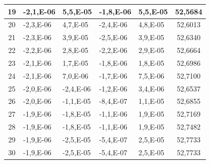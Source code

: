 \begin{table}[]
\begin{tabular}{|c|l|l|l|l|c|}
{\color[HTML]{000000} 19}      & {\color[HTML]{000000} -2,1,E-06}   & {\color[HTML]{000000} 5,5,E-05}    & {\color[HTML]{000000} -1,8,E-06}   & {\color[HTML]{000000} 5,5,E-05}       & {\color[HTML]{000000} 52,5684} \\ \hline
{\color[HTML]{000000} 20}      & {\color[HTML]{000000} -2,3,E-06}   & {\color[HTML]{000000} 4,7,E-05}    & {\color[HTML]{000000} -2,4,E-06}   & {\color[HTML]{000000} 4,8,E-05}       & {\color[HTML]{000000} 52,6013} \\ \hline
{\color[HTML]{000000} 21}      & {\color[HTML]{000000} -2,3,E-06}   & {\color[HTML]{000000} 3,9,E-05}    & {\color[HTML]{000000} -2,5,E-06}   & {\color[HTML]{000000} 3,9,E-05}       & {\color[HTML]{000000} 52,6340} \\ \hline
{\color[HTML]{000000} 22}      & {\color[HTML]{000000} -2,2,E-06}   & {\color[HTML]{000000} 2,8,E-05}    & {\color[HTML]{000000} -2,2,E-06}   & {\color[HTML]{000000} 2,9,E-05}       & {\color[HTML]{000000} 52,6664} \\ \hline
{\color[HTML]{000000} 23}      & {\color[HTML]{000000} -2,1,E-06}   & {\color[HTML]{000000} 1,7,E-05}    & {\color[HTML]{000000} -1,8,E-06}   & {\color[HTML]{000000} 1,8,E-05}       & {\color[HTML]{000000} 52,6986} \\ \hline
{\color[HTML]{000000} 24}      & {\color[HTML]{000000} -2,1,E-06}   & {\color[HTML]{000000} 7,0,E-06}    & {\color[HTML]{000000} -1,7,E-06}   & {\color[HTML]{000000} 7,5,E-06}       & {\color[HTML]{000000} 52,7100} \\ \hline
{\color[HTML]{000000} 25}      & {\color[HTML]{000000} -2,0,E-06}   & {\color[HTML]{000000} -2,4,E-06}   & {\color[HTML]{000000} -1,2,E-06}   & {\color[HTML]{000000} 3,4,E-06}       & {\color[HTML]{000000} 52,6537} \\ \hline
{\color[HTML]{000000} 26}      & {\color[HTML]{000000} -2,0,E-06}   & {\color[HTML]{000000} -1,1,E-05}   & {\color[HTML]{000000} -8,4,E-07}   & {\color[HTML]{000000} 1,1,E-05}       & {\color[HTML]{000000} 52,6855} \\ \hline
{\color[HTML]{000000} 27}      & {\color[HTML]{000000} -1,9,E-06}   & {\color[HTML]{000000} -1,8,E-05}   & {\color[HTML]{000000} -1,1,E-06}   & {\color[HTML]{000000} 1,9,E-05}       & {\color[HTML]{000000} 52,7169} \\ \hline
{\color[HTML]{000000} 28}      & {\color[HTML]{000000} -1,9,E-06}   & {\color[HTML]{000000} -1,8,E-05}   & {\color[HTML]{000000} -1,1,E-06}   & {\color[HTML]{000000} 1,9,E-05}       & {\color[HTML]{000000} 52,7482} \\ \hline
{\color[HTML]{000000} 29}      & {\color[HTML]{000000} -1,9,E-06}   & {\color[HTML]{000000} -2,5,E-05}   & {\color[HTML]{000000} -5,4,E-07}   & {\color[HTML]{000000} 2,5,E-05}       & {\color[HTML]{000000} 52,7733} \\ \hline
{\color[HTML]{000000} 30}      & {\color[HTML]{000000} -1,9,E-06}   & {\color[HTML]{000000} -2,5,E-05}   & {\color[HTML]{000000} -5,4,E-07}   & {\color[HTML]{000000} 2,5,E-05}       & {\color[HTML]{000000} 52,7733} \\ \hline
\end{tabular}
\end{table}

